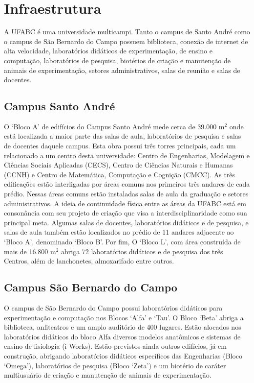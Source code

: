 \section{Infraestrutura}

A UFABC é uma universidade multicampi.
Tanto o campus de Santo André como o campus de São Bernardo do Campo possuem
biblioteca, conexão de internet de alta velocidade, laboratórios didáticos de
experimentação, de ensino e computação, laboratórios de pesquisa, biotérios de
criação e manutenção de animais de experimentação, setores administrativos,
salas de reunião e salas de docentes.

\subsection{Campus Santo André}

O `Bloco A' de edifícios do Campus Santo André mede cerca de 39.000 m$^2$ onde
está localizada a maior parte das salas de aula, laboratórios de pesquisa e
salas de docentes daquele campus.
Esta obra possui três torres principais, cada um relacionado a um centro desta
universidade: Centro de Engenharias, Modelagem e Ciências Sociais Aplicadas
(CECS), Centro de Ciências Naturais e Humanas (CCNH) e Centro de Matemática,
Computação e Cognição (CMCC). 
As três edificações estão interligadas por áreas comuns nos primeiros três
andares de cada prédio.
Nessas áreas comuns estão instaladas salas de aula da graduação e setores
administrativos.
A ideia de continuidade física entre as áreas da UFABC está em consonância com
seu projeto de criação que visa a interdisciplinaridade como sua principal
meta.
Algumas salas de docentes, laboratórios didáticos e de pesquisa, e salas de
aula também estão localizados no prédio de 11 andares adjacente ao `Bloco A',
denominado `Bloco B'.
Por fim, O `Bloco L', com área construída de mais de 16.800 m$^2$ abriga 72
laboratórios didáticos e de pesquisa dos três Centros, além de lanchonetes,
almoxarifado entre outros.

\subsection{Campus São Bernardo do Campo} 

O campus de São Bernardo do Campo possui laboratórios didáticos para
experimentação e computação nos Blocos `Alfa' e `Tau'.
O Bloco `Beta' abriga a biblioteca, anfiteatros e um amplo auditório de 400
lugares.
Estão alocados nos laboratórios didáticos do bloco Alfa diversos modelos
anatômicos e sistemas de ensino de fisiologia (i-Works).
Estão previstos ainda outros edifícios, já em construção, abrigando
laboratórios didáticos específicos das Engenharias (Bloco `Omega'),
laboratórios de pesquisa (Bloco `Zeta') e um biotério de caráter multiusuário
de criação e manutenção de animais de experimentação.


